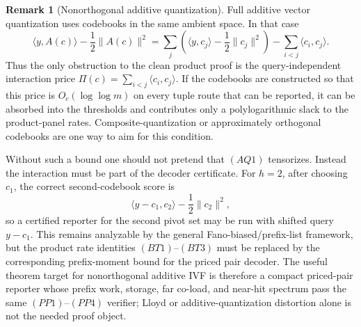 \documentclass[10pt]{article}
\theoremstyle{definition}
\newtheorem{remark}[theorem]{Remark}
\newcommand{\ip}[2]{\langle #1,#2\rangle}
\begin{document}
\begin{remark}[Nonorthogonal additive quantization]
   \label{rem:nonorthogonal-additive-ivf}
   Full additive vector quantization uses codebooks in the same ambient space.
   In that case
   \[
      \ip{y}{A(c)}-\frac12\|A(c)\|^2
      =
      \sum_j\left(\ip{y}{c_j}-\frac12\|c_j\|^2\right)
      -
      \sum_{i<j}\ip{c_i}{c_j}.
      \tag{AQ1}
   \]
   Thus the only obstruction to the clean product proof is the
   query-independent interaction price
   \(\Pi(c)=\sum_{i<j}\ip{c_i}{c_j}\).  If the codebooks are constructed so
   that this price is \(O_c(\log\log m)\) on every tuple route that can be
   reported, it can be absorbed into the thresholds and contributes only a
   polylogarithmic slack to the product-panel rates.  Composite-quantization or
   approximately orthogonal codebooks are one way to aim for this condition.

   Without such a bound one should not pretend that \((AQ1)\) tensorizes.
   Instead the interaction must be part of the decoder certificate.  For
   \(h=2\), after choosing \(c_1\), the correct second-codebook score is
   \[
      \ip{y-c_1}{c_2}-\frac12\|c_2\|^2,
   \]
   so a certified reporter for the second pivot set may be run with shifted
   query \(y-c_1\).  This remains analyzable by the general
   Fano-biased/prefix-list framework, but the product rate identities
   \((BT1)\)--\((BT3)\) must be replaced by the corresponding prefix-moment
   bound for the priced pair decoder.  The useful theorem target for
   nonorthogonal additive IVF is therefore a compact priced-pair reporter whose
   prefix work, storage, far co-load, and near-hit spectrum pass the same
   \((PP1)\)--\((PP4)\) verifier; Lloyd or additive-quantization distortion
   alone is not the needed proof object.
\end{remark}
\end{document}
